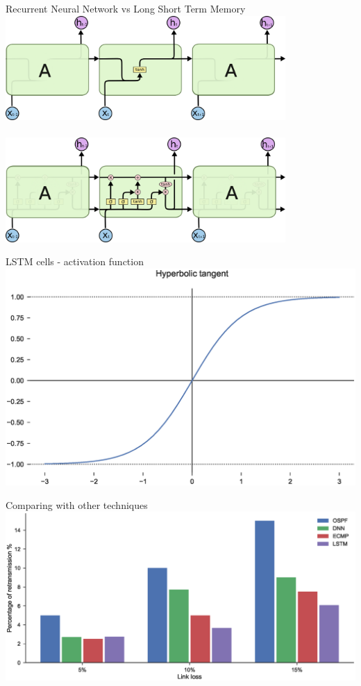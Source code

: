 \documentclass{beamer}
\begin{document}
\begin{frame}[noframenumbering]{Recurrent Neural Network vs Long Short Term Memory}
\centering
\includegraphics[width=0.8\textwidth]{img/simple_rnn}\\~\\
\includegraphics[width=0.8\textwidth]{img/simple_lstm}
\end{frame}
\begin{frame}[noframenumbering]{LSTM cells - activation function}
\includegraphics[width=\textwidth]{img/tanh.eps}
\end{frame}
\begin{frame}[noframenumbering]{Comparing with other techniques}
\includegraphics[width=\textwidth]{img/prediction_full_cmp_bar}
\end{frame}
\end{document}
